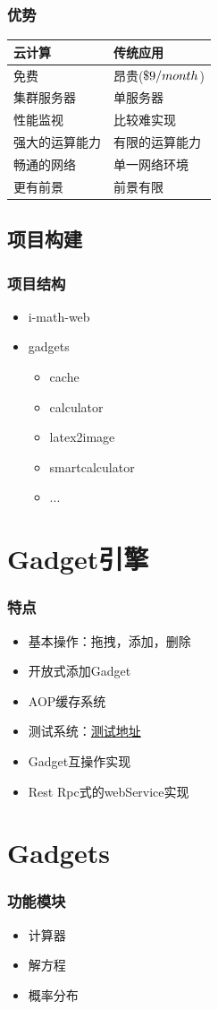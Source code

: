 \documentclass[dvipdfm,serif,mathserif]{beamer}
\renewcommand{\textdollar}{{\char"0024}}
\begin{document}
\begin{frame}
  \frametitle{优势}
\begin{center}
\begin{tabular}{m{}m{}}
\hline
云计算 & 传统应用 \\
\hline
免费   & 昂贵($ \textdollar 9 / month$)    \\
集群服务器   & 单服务器   \\
性能监视  & 比较难实现   \\
强大的运算能力   & 有限的运算能力   \\
畅通的网络   & 单一网络环境   \\
更有前景  & 前景有限   \\
\hline
\end{tabular}
\end{center}
\end{frame}

\subsection{项目构建}
\begin{frame}
  \frametitle{项目结构}
\begin{itemize}
 \item i-math-web
\item gadgets
\begin{itemize}
 \item cache
 \item calculator
 \item latex2image
 \item smartcalculator
 \item ...
\end{itemize}
\end{itemize}
\end{frame}

\section{Gadget引擎}

\begin{frame}
  \frametitle{特点}
\begin{itemize}
\item 基本操作：拖拽，添加，删除
\item 开放式添加Gadget
\item AOP缓存系统
\item 测试系统：\href{ http://i-math.appspot.com/ifr.action?url=http://i-math.appspot.com/gadgets/add-gadget/add-gadget.xml}{\color{blue}测试地址}
\item Gadget互操作实现
\item Rest Rpc式的webService实现
\end{itemize}
\end{frame}

\section{Gadgets}

\begin{frame}
  \frametitle{功能模块}
\begin{itemize}
\item 计算器
\item 解方程
\item 概率分布
\end{itemize}

\end{frame}
\end{document}
